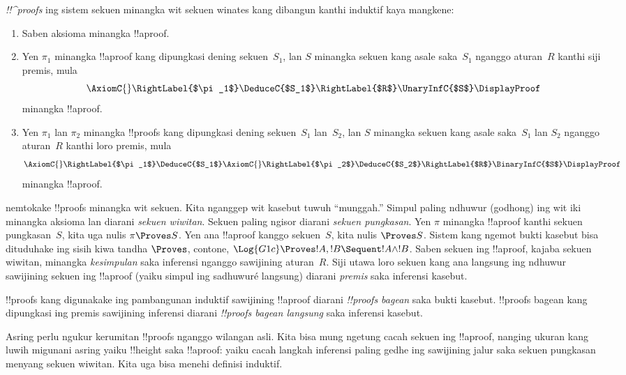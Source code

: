 \documentclass[../../../include/open-logic-section]{subfiles}
\begin{document}
\begin{defn}
\emph{!!^{proof}s} ing sistem sekuen minangka wit sekuen winates
kang dibangun kanthi induktif kaya mangkene:
\begin{enumerate}
  \item{} Saben aksioma minangka !!a{proof}.
  \item{} Yen $\pi_1$ minangka !!a{proof}
  kang dipungkasi dening sekuen~$S_1$, lan $S$ minangka sekuen
  kang asale saka~$S_1$ nganggo aturan~$R$ kanthi siji premis, mula
  \[
  \AxiomC{}
  \RightLabel{$\pi_1$}
  \DeduceC{$S_1$}
  \RightLabel{$R$}
  \UnaryInfC{$S$}
  \DisplayProof
  \]
  minangka !!a{proof}.
  \item{} Yen $\pi_1$ lan $\pi_2$ minangka
  !!{proof}s kang dipungkasi dening sekuen~$S_1$ lan~$S_2$, lan
  $S$ minangka sekuen kang asale saka~$S_1$ lan $S_2$ nganggo
  aturan~$R$ kanthi loro premis, mula
  \[
  \AxiomC{}
  \RightLabel{$\pi_1$}
  \DeduceC{$S_1$}
  \AxiomC{}
  \RightLabel{$\pi_2$}
  \DeduceC{$S_2$}
  \RightLabel{$R$}
  \BinaryInfC{$S$}
  \DisplayProof
  \]
  minangka !!a{proof}.
\end{enumerate}
\end{defn}

 nemtokake !!{proof}s minangka wit sekuen.
Kita nganggep wit kasebut tuwuh ``munggah.'' Simpul paling ndhuwur
(godhong) ing wit iki minangka aksioma lan diarani \emph{sekuen wiwitan}.
Sekuen paling ngisor diarani \emph{sekuen pungkasan}. Yen $\pi$
minangka !!a{proof} kanthi sekuen pungkasan~$S$, kita uga nulis
$\pi \Proves S$. Yen ana !!a{proof} kanggo sekuen~$S$, kita nulis
$\Proves S$. Sistem kang ngemot bukti kasebut bisa dituduhake ing
sisih kiwa tandha $\Proves$, contone,
$\Log{G1c} \Proves !A, !B \Sequent !A \land !B$.
Saben sekuen ing !!a{proof}, kajaba sekuen wiwitan, minangka
\emph{kesimpulan} saka inferensi nganggo sawijining aturan~$R$.
Siji utawa loro sekuen kang ana langsung ing ndhuwur sawijining sekuen
ing !!a{proof} (yaiku simpul ing sadhuwuré langsung) diarani \emph{premis}
saka inferensi kasebut.

!!{proof}s kang digunakake ing pambangunan induktif sawijining
!!a{proof} diarani \emph{!!{proof}s bagean} saka bukti kasebut.
!!{proof}s bagean kang dipungkasi ing premis sawijining inferensi
diarani \emph{!!{proof}s bagean langsung} saka inferensi kasebut.

Asring perlu ngukur kerumitan !!{proof}s nganggo wilangan asli.
Kita bisa mung ngetung cacah sekuen ing !!a{proof}, nanging ukuran
kang luwih migunani asring yaiku !!{height} saka !!a{proof}:
yaiku cacah langkah inferensi paling gedhe ing sawijining jalur
saka sekuen pungkasan menyang sekuen wiwitan. Kita uga bisa menehi
definisi induktif.
\end{document}
